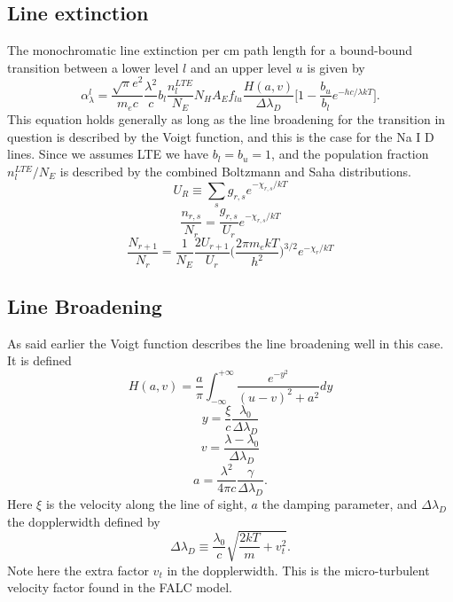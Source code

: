 \documentclass{aa}   %
\begin{document}
\subsection{Line extinction}
The monochromatic line extinction per cm path length for a bound-bound transition between a lower level $l$ and an upper level $u$ is given by
\begin{equation}
 \alpha_\lambda^l = \frac{\sqrt{\pi}e^2}{m_e c}\frac{\lambda^2}{c}b_l \frac{n_l^{LTE}}{N_E}N_H A_E f_{lu} \frac{H(a,v)}{\Delta\lambda_D}\bigg[1 - \frac{b_u}{b_l}e^{-hc/\lambda kT}\bigg].
\end{equation}
This equation holds generally as long as the line broadening for the transition in question is described by the Voigt function, and this is the case for the Na I D lines. Since we assumes LTE we have $b_l = b_u = 1$, and the population fraction $n_l^{LTE}/N_E$ is described by the combined Boltzmann and Saha distributions.
\begin{equation}
 U_R \equiv \sum_s g_{r,s} e^{-\chi_{r,s}/kT}
\end{equation}
\begin{equation}
 \frac{n_{r,s}}{N_r} = \frac{g_{r,s}}{U_r}e^{-\chi_{r,s}/kT}
\end{equation}
\begin{equation}
 \frac{N_{r+1}}{N_r} = \frac{1}{N_E}\frac{2U_{r+1}}{U_r}\bigg(\frac{2\pi m_e kT}{h^2}\bigg)^{3/2}e^{-\chi_r/kT}
\end{equation}

\subsection{Line Broadening}
As said earlier the Voigt function describes the line broadening well in this case.
It is defined 
\begin{equation}
 H(a,v) = \frac{a}{\pi}\int_{-\infty}^{+\infty}\frac{e^{-y^2}}{(u-v)^2 + a^2}dy
\end{equation}\label{Voigt}
\begin{equation}
 y = \frac{\xi}{c} \frac{\lambda_0} {\Delta \lambda_D}
\end{equation}
\begin{equation}
 v = \frac{\lambda-\lambda_0}{\Delta\lambda_D}
\end{equation}
\begin{equation}
 a = \frac{\lambda^2}{4\pi c}\frac{\gamma}{\Delta\lambda_D}.
\end{equation}
Here $\xi$ is the velocity along the line of sight, $a$ the damping parameter, and $\Delta\lambda_D$ the dopplerwidth defined by
\begin{equation}
 \Delta\lambda_D \equiv \frac{\lambda_0}{c}\sqrt{\frac{2kT}{m}+v_t^2}.
\end{equation}
Note here the extra factor $v_t$ in the dopplerwidth. This is the micro-turbulent velocity factor found in the FALC model.
\end{document}
